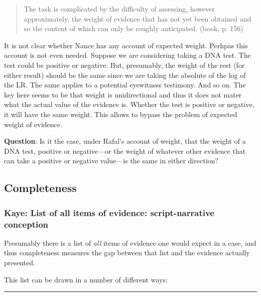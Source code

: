\documentclass[
  10pt,
  dvipsnames,enabledeprecatedfontcommands]{scrartcl}
\begin{document}
\begin{quote}
The task is complicated by the difficulty of assessing, however approximately, the weight of evidence that has not yet been obtained and so the content of which can only be roughly anticipated. (book, p. 156)
\end{quote}

It is not clear whether Nance has any account of expected weight.
Perhpas this account is not even needed. Suppose we are considering
taking a DNA test. The test could be positive or negative. But,
presumably, the weight of the rest (for either result) should be the
same since we are taking the absolute of the log of the LR. The same
applies to a potential eyewitness testimony. And so on. The key here
seems to be that weight is unidirectional and thus it does not mater
what the actual value of the evidence is. Whether the test is positive
or negative, it will have the same weight. This allows to bypass the
problem of expected weight of
evidence.

\textbf{Question}: Is it the case, under Rafal's account of weight, that
the weight of a DNA test, positive or negative---or the weight of
whatever other evidence that can take a positive or negative value---is
the same in either direction?


\hypertarget{completeness}{%
\subsection{Completeness}\label{completeness}}

\hypertarget{kaye-list-of-all-items-of-evidence-script-narrative-conception}{%
\subsubsection{Kaye: List of all items of evidence: script-narrative
conception}\label{kaye-list-of-all-items-of-evidence-script-narrative-conception}}

Presumably there is a list of \emph{all} items of evidence one would
expect in a case, and thus completeness measures the gap between that
list and the evidence actually presented.

This list can be drawn in a number of different ways:

\begin{center}\rule{0.5\linewidth}{0.5pt}\end{center}
\end{document}
